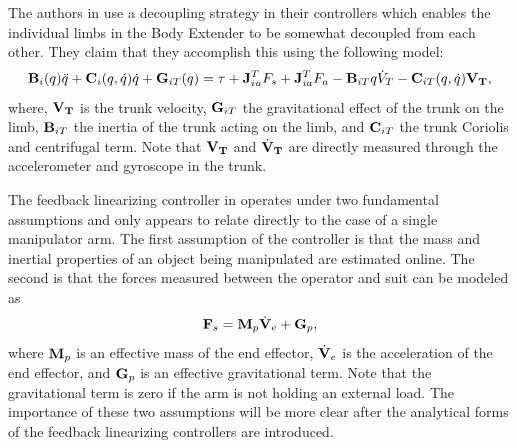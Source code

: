 \begin{refsection}
The authors in \cite{body_control_2012} use a decoupling strategy in their controllers which enables the individual limbs in the Body Extender to be somewhat decoupled from each other.  They claim that they accomplish this using the following model:
\begin{equation}
{\bf B}_i(q) \ddot{q} + {\bf C}_i(q,\dot{q})\dot{q} + {\bf G}_{iT}(q) = {\bf \tau} + {\bf J}^T_{iu}F_s + {\bf J}^T_{ia}F_a - {\bf B}_{iT}{q}\dot{V}_T - {\bf C}_{iT}(q,\dot{q}){\bf V_T},
\end{equation}
where, ${\bf V_T}$ is the trunk velocity, ${\bf G}_{iT}$ the gravitational effect of the trunk on the limb, ${\bf B}_{iT}$ the inertia of the trunk acting on the limb, and ${\bf C}_{iT}$ the trunk Coriolis and centrifugal term.  Note that ${\bf V_T}$ and $\dot{{\bf V}}_{\bf T}$ are directly measured through the accelerometer and gyroscope in the trunk.

The feedback linearizing controller in 
operates under two fundamental assumptions and only appears to relate directly to the case of a single manipulator arm.  The first assumption of the controller is that the mass and inertial properties of an object being manipulated are estimated online.  The second is that the forces measured between the operator and suit can be modeled as
\begin{equation}
{\bf F}_s = {\bf M}_p \dot{{\bf V}}_e + {\bf G}_p,
\label{eq:forceEq}
\end{equation}
where ${\bf M}_p$ is an effective mass of the end effector, $\dot{{\bf V}}_e$ is the acceleration of the end effector, and ${\bf G}_p$ is an effective gravitational term.  Note that the gravitational term is zero if the arm is not holding an external load.  The importance of these two assumptions will be more clear after the analytical forms of the feedback linearizing controllers are introduced. 


\end{refsection}
